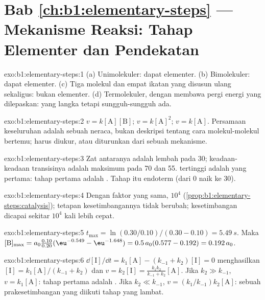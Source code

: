 \section*{Bab \ref{ch:b1:elementary-steps} --- Mekanisme Reaksi: Tahap Elementer dan Pendekatan}

\begin{solution}{exo:b1:elementary-steps:1}
(a) Unimolekuler: dapat elementer. (b) Bimolekuler: dapat elementer.
(c) Tiga molekul dan empat ikatan yang disusun ulang sekaligus: bukan
elementer. (d) Termolekuler, dengan  membawa pergi energi yang
dilepaskan:  yang langka tetapi sungguh-sungguh ada.
\end{solution}

\begin{solution}{exo:b1:elementary-steps:2}
$v = k[\mathrm{A}][\mathrm{B}]$; $v = k[\mathrm{A}]^2$; $v = k[\mathrm{A}]$.
Persamaan keseluruhan adalah sebuah neraca, bukan deskripsi tentang cara
molekul-molekul bertemu;  harus diukur, atau diturunkan dari
sebuah mekanisme.
\end{solution}

\begin{solution}{exo:b1:elementary-steps:3}
Zat antaranya adalah lembah pada 30; keadaan-keadaan transisinya adalah
maksimum pada 70 dan 55.  tertinggi adalah yang pertama:
tahap pertama adalah . Tahap itu endoterm (dari 0 naik
ke 30).
\end{solution}

\begin{solution}{exo:b1:elementary-steps:4}
Dengan faktor yang sama, $10^4$ (\cref{prop:b1:elementary-steps:catalysis});
tetapan kesetimbangannya tidak berubah; kesetimbangan dicapai sekitar
$10^4$ kali lebih cepat.
\end{solution}

\begin{solution}{exo:b1:elementary-steps:5}
$t_{\max} = \ln(0.30/0.10)/(0.30 - 0.10) = \qty{5.49}{s}$. Maka
$[\mathrm{B}]_{\max} = a_0\frac{0.10}{0.20}(\eu^{-0.549} - \eu^{-1.648}) =
0.5\,a_0(0.577 - 0.192) = 0.192\,a_0$.
\end{solution}

\begin{solution}{exo:b1:elementary-steps:6}
$\dd[\mathrm{I}]/\dd t = k_1[\mathrm{A}] - (k_{-1} + k_2)[\mathrm{I}] = 0$
menghasilkan $[\mathrm{I}] = k_1[\mathrm{A}]/(k_{-1} + k_2)$ dan $v = k_2[\mathrm{I}]
= \frac{k_1k_2}{k_{-1}+k_2}[\mathrm{A}]$. Jika $k_2 \gg k_{-1}$, $v =
k_1[\mathrm{A}]$: tahap pertama adalah . Jika
$k_2 \ll k_{-1}$, $v = (k_1/k_{-1})k_2[\mathrm{A}]$: sebuah
prakesetimbangan yang diikuti tahap yang lambat.
\end{solution}

